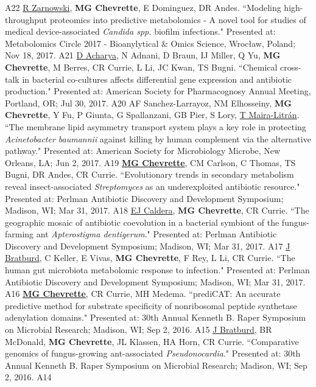 \begin{cvpubs}
    {A22} %
  \cvpub
    {\underline{R Zarnowski}, \textbf{MG Chevrette}, E Dominguez, DR Andes. ``Modeling high-throughput proteomics into predictive metabolomics - A novel tool for studies of medical device-associated \textit{Candida spp.} biofilm infections." Presented at: Metabolomics Circle 2017 - Bioanylytical \& Omics Science, Wrocław, Poland; Nov 18, 2017.} %
    {A21} %
  \cvpub
    {\underline{D Acharya}, N Adnani, D Braun, IJ Miller, Q Yu, \textbf{MG Chevrette}, M Berres, CR Currie, L Li, JC Kwan, TS Bugni. ``Chemical cross-talk in bacterial co-cultures affects differential gene expression and antibiotic production." Presented at: American Society for Pharmacognosy Annual Meeting, Portland, OR; Jul 30, 2017.} %
    {A20} %
  \cvpub
    {AF Sanchez-Larrayoz, NM Elhosseiny, \textbf{MG Chevrette}, Y Fu, P Giunta, G Spallanzani, GB Pier, S Lory, \underline{T Maira-Litr\'{a}n}. ``The membrane lipid asymmetry transport system plays a key role in protecting \textit{Acinetobacter baumannii} against killing by human complement via the alternative pathway." Presented at: American Society for Microbiology Microbe, New Orleans, LA; Jun 2, 2017.} %
    {A19} %
  \cvpub
    {\underline{\textbf{MG Chevrette}}, CM Carlson, C Thomas, TS Bugni, DR Andes, CR Currie. ``Evolutionary trends in secondary metabolism reveal insect-associated \textit{Streptomyces} as an underexploited antibiotic resource." Presented at: Perlman Antibiotic Discovery and Development Symposium; Madison, WI; Mar 31, 2017.} %
    {A18} %
  \cvpub
    {\underline{EJ Caldera}, \textbf{MG Chevrette}, CR Currie. ``The geographic mosaic of antibiotic coevolution in a bacterial symbiont of the fungus-farming ant \textit{Apterostigma dentigerum}." Presented at: Perlman Antibiotic Discovery and Development Symposium; Madison, WI; Mar 31, 2017.} %
    {A17} %
  \cvpub
    {\underline{J Bratburd}, C Keller, E Vivas, \textbf{MG Chevrette}, F Rey, L Li, CR Currie. ``The human gut microbiota metabolomic response to infection." Presented at: Perlman Antibiotic Discovery and Development Symposium; Madison, WI; Mar 31, 2017.} %
    {A16} %
  \cvpub
    {\textbf{\underline{MG Chevrette}}, CR Currie, MH Medema.  ``prediCAT: An accurate predictive method for substrate specificity of nonribosomal peptide synthetase adenylation domains." Presented at: 30th Annual Kenneth B. Raper Symposium on Microbial Research; Madison, WI; Sep 2, 2016.} %
    {A15} %
  \cvpub
    {\underline{J Bratburd}, BR McDonald, \textbf{MG Chevrette}, JL Klassen, HA Horn, CR Currie. ``Comparative genomics of fungus-growing ant-associated \textit{Pseudonocardia}." Presented at: 30th Annual Kenneth B. Raper Symposium on Microbial Research; Madison, WI; Sep 2, 2016.} %
    {A14} %
\end{cvpubs}
